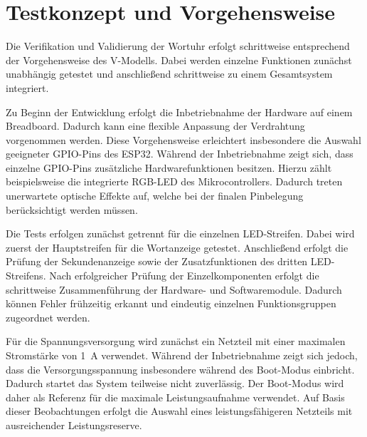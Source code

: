 \section{Testkonzept und Vorgehensweise} 
Die Verifikation und Validierung der Wortuhr erfolgt schrittweise entsprechend der Vorgehensweise des V-Modells.  
Dabei werden einzelne Funktionen zunächst unabhängig getestet und anschließend schrittweise zu einem Gesamtsystem integriert.  

Zu Beginn der Entwicklung erfolgt die Inbetriebnahme der Hardware auf einem Breadboard.  
Dadurch kann eine flexible Anpassung der Verdrahtung vorgenommen werden.  
Diese Vorgehensweise erleichtert insbesondere die Auswahl geeigneter GPIO-Pins des ESP32.  
Während der Inbetriebnahme zeigt sich, dass einzelne GPIO-Pins zusätzliche Hardwarefunktionen besitzen.  
Hierzu zählt beispielsweise die integrierte RGB-LED des Mikrocontrollers.  
Dadurch treten unerwartete optische Effekte auf, welche bei der finalen Pinbelegung berücksichtigt werden müssen.  

Die Tests erfolgen zunächst getrennt für die einzelnen LED-Streifen.  
Dabei wird zuerst der Hauptstreifen für die Wortanzeige getestet.  
Anschließend erfolgt die Prüfung der Sekundenanzeige sowie der Zusatzfunktionen des dritten LED-Streifens.  
Nach erfolgreicher Prüfung der Einzelkomponenten erfolgt die schrittweise Zusammenführung der Hardware- und Softwaremodule.  
Dadurch können Fehler frühzeitig erkannt und eindeutig einzelnen Funktionsgruppen zugeordnet werden.  

Für die Spannungsversorgung wird zunächst ein Netzteil mit einer maximalen Stromstärke von 1~A verwendet.  
Während der Inbetriebnahme zeigt sich jedoch, dass die Versorgungsspannung insbesondere während des Boot-Modus einbricht.  
Dadurch startet das System teilweise nicht zuverlässig.  
Der Boot-Modus wird daher als Referenz für die maximale Leistungsaufnahme verwendet.  
Auf Basis dieser Beobachtungen erfolgt die Auswahl eines leistungsfähigeren Netzteils mit ausreichender Leistungsreserve. 